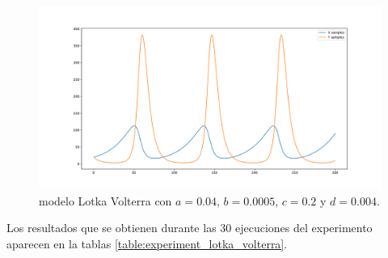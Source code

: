 \begin{figure}[h]
    \centering
    \includegraphics[width=\textwidth]{"figures/lotka_volterra.pdf"}
    \caption{modelo Lotka Volterra con $a = 0.04$, $b = 0.0005$, $c = 0.2$ y $d = 0.004$.}
    \label{fig:lotka_volterra}
\end{figure}

Los resultados que se obtienen durante las 30 ejecuciones del experimento aparecen en la tablas \ref{table:experiment_lotka_volterra}.

